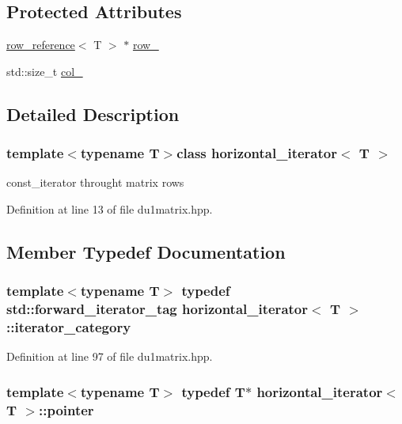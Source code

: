 \subsection*{Protected Attributes}
\begin{DoxyCompactItemize}
\item 
\hyperlink{classrow__reference}{row\-\_\-reference}$<$ T $>$ $\ast$ \hyperlink{classhorizontal__iterator_a29e59ea8f9dcb2a05ca56673636faf77}{row\-\_\-}
\item 
std\-::size\-\_\-t \hyperlink{classhorizontal__iterator_aaabc9b0ce0387ee55a7663dfb87bfb93}{col\-\_\-}
\end{DoxyCompactItemize}


\subsection{Detailed Description}
\subsubsection*{template$<$typename T$>$class horizontal\-\_\-iterator$<$ T $>$}

const\-\_\-iterator throught matrix rows 

Definition at line 13 of file du1matrix.\-hpp.



\subsection{Member Typedef Documentation}
\hypertarget{classhorizontal__iterator_ab7d0fbb5c4be316048d3199a56b2090b}{
\subsubsection[{iterator\-\_\-category}]{\setlength{\rightskip}{0pt plus 5cm}template$<$typename T$>$ typedef std\-::forward\-\_\-iterator\-\_\-tag {\bf horizontal\-\_\-iterator}$<$ T $>$\-::{\bf iterator\-\_\-category}}}\label{classhorizontal__iterator_ab7d0fbb5c4be316048d3199a56b2090b}


Definition at line 97 of file du1matrix.\-hpp.

\hypertarget{classhorizontal__iterator_a2fde5b2bd7677798fe3ca0d8e614c039}{
\subsubsection[{pointer}]{\setlength{\rightskip}{0pt plus 5cm}template$<$typename T$>$ typedef T$\ast$ {\bf horizontal\-\_\-iterator}$<$ T $>$\-::{\bf pointer}}}\label{classhorizontal__iterator_a2fde5b2bd7677798fe3ca0d8e614c039}


